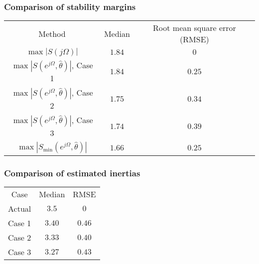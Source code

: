 \begin{frame}
	\frametitle{Comparison of stability margins}
			\begin{tabular}{c c c}
			\toprule
			Method & Median & Root mean square error (RMSE) \\
			$\max |S(j\Omega)|$ & $1.84$ & $0$ \\
			$\max |S(e^{j\Omega},\hat{\theta})|$, Case 1 & $1.84$ & $0.25$ \\
			$\max |S(e^{j\Omega},\hat{\theta})|$, Case 2 & $1.75$ & $0.34$ \\
			$\max |S(e^{j\Omega},\hat{\theta})|$, Case 3 & $1.74$ & $0.39$ \\
			$\max |S_{\min}(e^{j\Omega},\hat{\theta})|$ & $1.66$ & $0.25$ \\
			\bottomrule
	\end{tabular}
\end{frame}
\begin{frame}
	\frametitle{Comparison of estimated inertias}
	\begin{tabular}{c c c}
			\toprule
			Case & Median & RMSE \\
			Actual & $3.5$ & $0$ \\
			Case 1& $3.40$ & $0.46$ \\
			Case 2 & $3.33$ & $0.40$ \\
			Case 3 & $3.27$ & $0.43$ \\
			\bottomrule
	\end{tabular}
\end{frame}
	

